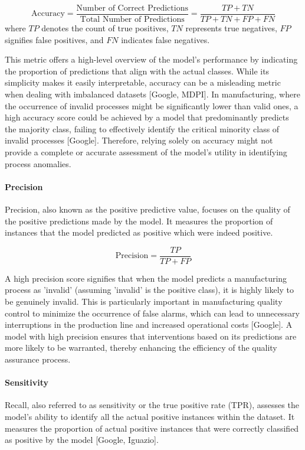 \begin{equation}
  \text{Accuracy} = \frac{\text{Number of Correct Predictions}}{\text{Total Number of Predictions}} = \frac{TP + TN}{TP + TN + FP + FN}
\end{equation}
where $TP$ denotes the count of true positives, $TN$ represents true negatives, $FP$ signifies false positives, and $FN$ indicates false negatives.

This metric offers a high-level overview of the model's performance by indicating the proportion of predictions that align with the actual classes. While its simplicity makes it easily interpretable, accuracy can be a misleading metric when dealing with imbalanced datasets [Google, MDPI]. In manufacturing, where the occurrence of invalid processes might be significantly lower than valid ones, a high accuracy score could be achieved by a model that predominantly predicts the majority class, failing to effectively identify the critical minority class of invalid processes [Google]. Therefore, relying solely on accuracy might not provide a complete or accurate assessment of the model's utility in identifying process anomalies.

\paragraph{\textbf{Precision}}
Precision, also known as the positive predictive value, focuses on the quality of the positive predictions made by the model. It measures the proportion of instances that the model predicted as positive which were indeed positive.


\begin{equation}
  \text{Precision} = \frac{TP}{TP + FP}
\end{equation}

A high precision score signifies that when the model predicts a manufacturing process as 'invalid' (assuming 'invalid' is the positive class), it is highly likely to be genuinely invalid. This is particularly important in manufacturing quality control to minimize the occurrence of false alarms, which can lead to unnecessary interruptions in the production line and increased operational costs [Google]. A model with high precision ensures that interventions based on its predictions are more likely to be warranted, thereby enhancing the efficiency of the quality assurance process.

\paragraph{\textbf{Sensitivity}}
Recall, also referred to as sensitivity or the true positive rate (TPR), assesses the model's ability to identify all the actual positive instances within the dataset. It measures the proportion of actual positive instances that were correctly classified as positive by the model [Google, Iguazio].

